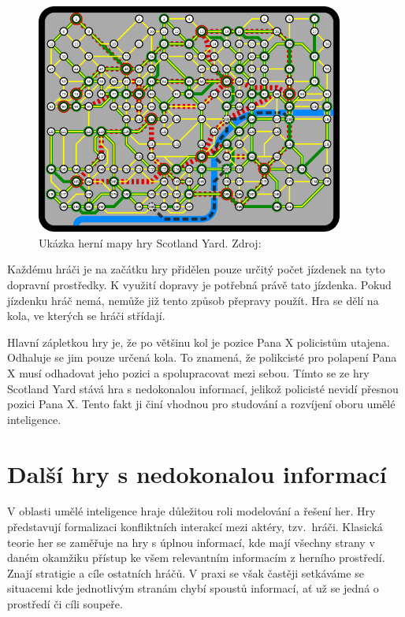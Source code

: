 \begin{figure}[H]
	\centering
	\includegraphics[width=0.9\textwidth]{obrazky-figures/scotland_original}
	\caption{Ukázka herní mapy hry Scotland Yard.
  Zdroj:\cite{scotland_original_image}}\label{fig:figure}
\end{figure}

Každému hráči je na začátku hry přidělen pouze určitý počet jízdenek na tyto dopravní prostředky.
K využití dopravy je potřebná právě tato jízdenka.
Pokud jízdenku hráč nemá, nemůže již tento způsob přepravy použít.
Hra se dělí na kola, ve kterých se hráči střídají.

Hlavní zápletkou hry je, že po většinu kol je pozice Pana X policistům utajena.
Odhaluje se jim pouze určená kola.
To znamená, že polikcisté pro polapení Pana X musí odhadovat jeho pozici a spolupracovat mezi sebou.
Tímto se ze hry Scotland Yard stává hra s nedokonalou informací, jelikož policisté nevidí přesnou pozici Pana X\@.
Tento fakt ji činí vhodnou pro studování a rozvíjení oboru umělé inteligence.

\section{Další hry s nedokonalou informací}\label{sec:dalsi-hry-s-nedokonalou-informaci}
V oblasti umělé inteligence hraje důležitou roli modelování a řešení her.
Hry představují formalizaci konfliktních interakcí mezi aktéry, tzv.~hráči.
Klasická teorie her se zaměřuje na hry s úplnou informací, kde mají všechny strany v daném okamžiku přístup ke všem relevantním informacím z herního prostředí.
Znají stratigie a cíle ostatních hráčů.
V praxi se však častěji setkáváme se situacemi kde jednotlivým stranám chybí spoustů informací, ať už se jedná o prostředí či cíli soupeře.

